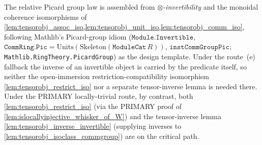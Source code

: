 The relative Picard group law is assembled from \emph{\(\otimes\)-invertibility}
and the monoidal coherence isomorphisms of
\cref{lem:tensorobj_assoc_iso,lem:tensorobj_unit_iso,lem:tensorobj_comm_iso},
following Mathlib's Picard-group idiom (\(\mathtt{Module.Invertible}\),
\(\mathtt{CommRing.Pic} = \mathrm{Units}(\mathrm{Skeleton}(\mathtt{ModuleCat}\,R))\),
\(\mathtt{instCommGroupPic}\); \texttt{Mathlib.RingTheory.PicardGroup}) as the
design template. Under the route~(e) fallback the inverse of an invertible object
is carried by the predicate itself, so neither the open-immersion
restriction-compatibility isomorphism \cref{lem:tensorobj_restrict_iso} nor a
separate tensor-inverse lemma is needed there. Under the PRIMARY locally-trivial
route, by contrast, both \cref{lem:tensorobj_restrict_iso} (via the PRIMARY proof
of \cref{lem:islocallyinjective_whisker_of_W}) and the tensor-inverse lemma
\cref{lem:tensorobj_inverse_invertible} (supplying inverses to
\cref{lem:tensorobj_isoclass_commgroup}) are on the critical path.

